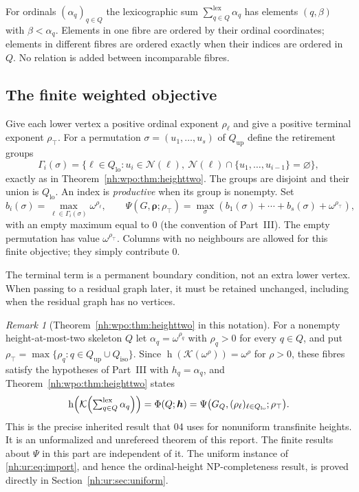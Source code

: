 \documentclass[11pt,a4paper]{article}
\theoremstyle{definition}
\theoremstyle{remark}
\newtheorem{remark}[theorem]{Remark}
\newcommand{\K}{\mathcal K}
\newcommand{\hgt}{\operatorname{h}}
\newcommand{\lxsi}{\mathop{\textstyle\sum}\nolimits^{\mathrm{lex}}}
\newcommand{\Qlo}{Q_{\mathrm{lo}}}
\newcommand{\Qup}{Q_{\mathrm{up}}}
\newcommand{\Qiso}{Q_{\mathrm{iso}}}
\newcommand{\Nb}{\mathcal N}
\newcommand{\rtop}{\rho_{\top}}
\begin{document}
For ordinals $(\alpha_q)_{q\in Q}$ the lexicographic sum
$\lxsi_{q\in Q}\alpha_q$ has elements $(q,\beta)$ with $\beta<\alpha_q$.
Elements in one fibre are ordered by their ordinal coordinates; elements in
different fibres are ordered exactly when their indices are ordered in $Q$.
No relation is added between incomparable fibres.

\subsection{The finite weighted objective}
Give each lower vertex a positive ordinal exponent $\rho_\ell$ and give a
positive terminal exponent $\rtop$. For a permutation
$\sigma=(u_1,\ldots,u_s)$ of $\Qup$ define the retirement groups
\begin{equation}\label{nh:ur:eq:groups}
 \Gamma_i(\sigma)=
 \{\ell\in\Qlo:u_i\in\Nb(\ell),\ \Nb(\ell)\cap\{u_1,\ldots,u_{i-1}\}=\varnothing\},
\end{equation}
exactly as in Theorem~\ref{nh:wpo:thm:heighttwo}. The groups are disjoint and
their union is $\Qlo$. An index is \emph{productive} when its group is
nonempty. Set
\begin{equation}\label{nh:ur:eq:objective}
 b_i(\sigma)=\max_{\ell\in\Gamma_i(\sigma)}\omega^{\rho_\ell},\qquad
 \Psi(G,\boldsymbol\rho;\rtop)=
 \max_\sigma\left(b_1(\sigma)+\cdots+b_s(\sigma)+\omega^{\rtop}\right),
\end{equation}
with an empty maximum equal to $0$ (the convention of Part~III). The empty
permutation has value $\omega^{\rtop}$. Columns with no neighbours are allowed
for this finite objective; they simply contribute $0$.

The terminal term is a permanent boundary condition, not an extra lower
vertex. When passing to a residual graph later, it must be retained
unchanged, including when the residual graph has no vertices.

\begin{remark}[Theorem~\ref{nh:wpo:thm:heighttwo} in this notation]
\label{nh:ur:rem:import}
For a nonempty height-at-most-two skeleton $Q$ let
$\alpha_q=\omega^{\rho_q}$ with $\rho_q>0$ for every $q\in Q$, and put
$\rtop=\max\{\rho_q:q\in\Qup\cup\Qiso\}$. Since $\hgt(\K(\omega^{\rho}))=\omega^\rho$
for $\rho>0$, these fibres satisfy the hypotheses of Part~III with
$h_q=\alpha_q$, and Theorem~\ref{nh:wpo:thm:heighttwo} states
\begin{equation}\label{nh:ur:eq:import}
 \hgt\Bigl(\K\Bigl(\lxsi_{q\in Q}\alpha_q\Bigr)\Bigr)
 =\Phi(Q;\boldsymbol h)=\Psi\bigl(G_Q,(\rho_\ell)_{\ell\in\Qlo};\rtop\bigr).
\end{equation}
This is the precise inherited result that 04 uses for nonuniform transfinite
heights. It is an unformalized and unrefereed theorem of this report. The
finite results about $\Psi$ in this part are independent of it. The uniform
instance of \eqref{nh:ur:eq:import}, and hence the ordinal-height
NP-completeness result, is proved directly in
Section~\ref{nh:ur:sec:uniform}.
\end{remark}
\end{document}
